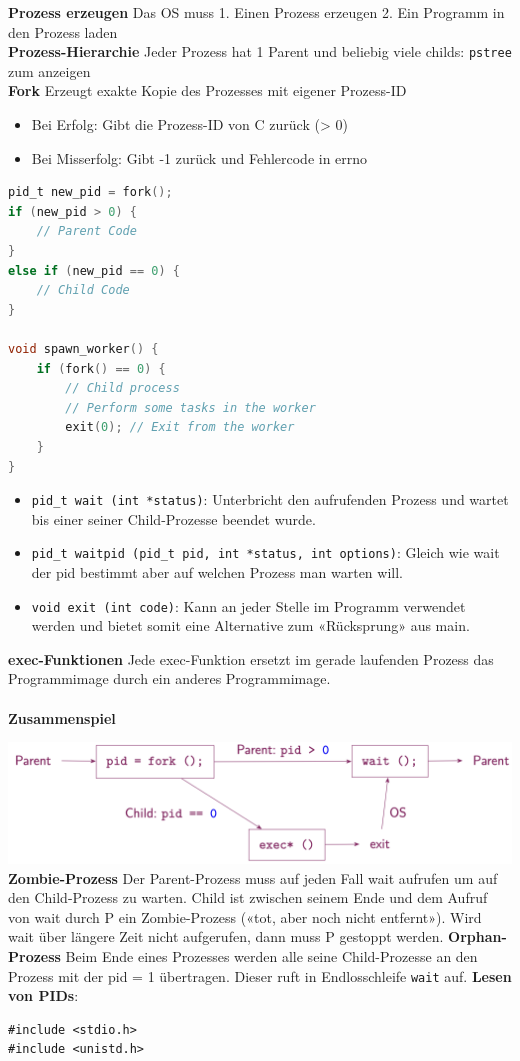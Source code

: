 \documentclass[8pt]{extarticle}
\let\oldtextbf\textbf
\renewcommand{\textbf}{\tiny\oldtextbf}
\begin{document}
\begin{multicols*}{5}
	\textbf{Prozess erzeugen} Das OS muss 1. Einen Prozess erzeugen 2. Ein Programm in den Prozess laden\\
	\textbf{Prozess-Hierarchie} Jeder Prozess hat 1 Parent und beliebig viele childs: \texttt{pstree} zum anzeigen\\
	
	\textbf{Fork} Erzeugt exakte Kopie des Prozesses mit eigener Prozess-ID
	\begin{itemize} [noitemsep, topsep=0pt, leftmargin=*]
		\item Bei Erfolg: Gibt die Prozess-ID von C zurück (> 0)
		\item Bei Misserfolg: Gibt -1 zurück und Fehlercode in errno
	\end{itemize}
	\begin{lstlisting}[language=c]
pid_t new_pid = fork();
if (new_pid > 0) {
	// Parent Code 
}
else if (new_pid == 0) {
	// Child Code
}

void spawn_worker() {
    if (fork() == 0) {
        // Child process
        // Perform some tasks in the worker
        exit(0); // Exit from the worker
    }
}
	\end{lstlisting}
	\begin{itemize} [noitemsep, topsep=0pt, leftmargin=*]
		\item \texttt{pid\_t wait (int *status)}: Unterbricht den aufrufenden Prozess und wartet bis einer seiner Child-Prozesse beendet wurde.
		\item \texttt{pid\_t waitpid (pid\_t pid, int *status, int options)}: Gleich wie wait der pid bestimmt aber auf welchen Prozess man warten will.
		\item \texttt{void exit (int code)}: Kann an jeder Stelle im Programm verwendet werden und bietet somit eine Alternative zum «Rücksprung» aus main.
	\end{itemize}
	\textbf{exec-Funktionen} Jede exec-Funktion ersetzt im gerade laufenden Prozess das Programmimage durch ein anderes Programmimage.\\\\
	\textbf{Zusammenspiel}
			
	\includegraphics[scale=0.299]{Prozesse.png}
	\textbf{Zombie-Prozess} Der Parent-Prozess muss auf jeden Fall wait aufrufen um auf den Child-Prozess zu warten. Child ist zwischen seinem Ende und dem Aufruf von wait durch P ein Zombie-Prozess («tot, aber noch nicht entfernt»). Wird wait über längere Zeit nicht aufgerufen, dann muss P gestoppt werden.
	\textbf{Orphan-Prozess}
	Beim Ende eines Prozesses werden alle seine Child-Prozesse an den Prozess mit der pid = 1 übertragen. Dieser ruft in Endlosschleife \texttt{wait} auf.
	\textbf{Lesen von PIDs}:
	\begin{lstlisting}
#include <stdio.h>
#include <unistd.h>


\end{lstlisting}
\end{multicols*}
\end{document}
